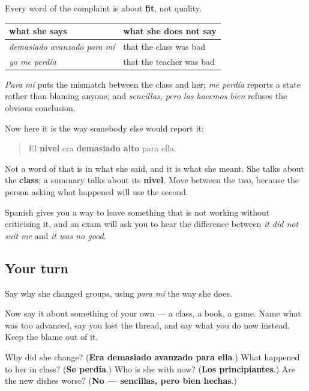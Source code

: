 \begin{grammarlens}[title={Grammar Lens: she never says the class was bad}]
Every word of the complaint is about \textbf{fit}, not quality.

\noindent
\begin{tabularx}{\linewidth}{@{}>{\raggedright\arraybackslash}X>{\raggedright\arraybackslash}X@{}}
\toprule
\textbf{what she says} & \textbf{what she does not say} \\
\midrule
\emph{demasiado avanzado para mí} & that the class was bad \\
\emph{yo me perdía} & that the teacher was bad \\
\bottomrule
\end{tabularx}

\emph{Para mí} puts the mismatch between the class and her; \emph{me perdía} reports a state rather than blaming anyone; and \emph{sencillas, pero las hacemos bien} refuses the obvious conclusion.

Now here it is the way somebody else would report it:

\begin{quote}
El \textbf{nivel} era \textbf{demasiado alto} para ella.
\end{quote}

Not a word of that is in what she said, and it is what she meant. She talks about the \textbf{class}; a summary talks about its \textbf{nivel}. Move between the two, because the person asking what happened will use the second.

Spanish gives you a way to leave something that is not working without criticising it, and an exam will ask you to hear the difference between \emph{it did not suit me} and \emph{it was no good}.
\end{grammarlens}

\subsection*{Your turn}
Say why she changed groups, using \emph{para mí} the way she does.

Now say it about something of your own — a class, a book, a game. Name what was too advanced, say you lost the thread, and say what you do now instead. Keep the blame out of it.

\begin{tcolorbox}[breakable,colback=teal!4,colframe=teal!35!black,title={Before you move on}]
Why did she change? (\textbf{Era demasiado avanzado para ella}.) What happened to her in class? (\textbf{Se perdía}.) Who is she with now? (\textbf{Los principiantes}.) Are the new dishes worse? (\textbf{No — sencillas, pero bien hechas}.)
\end{tcolorbox}
